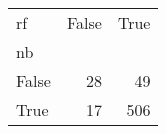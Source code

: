 \begin{tabular}{lrr}
\toprule
rf &  False &  True  \\
nb    &        &        \\
\midrule
False &     28 &     49 \\
True  &     17 &    506 \\
\bottomrule
\end{tabular}
